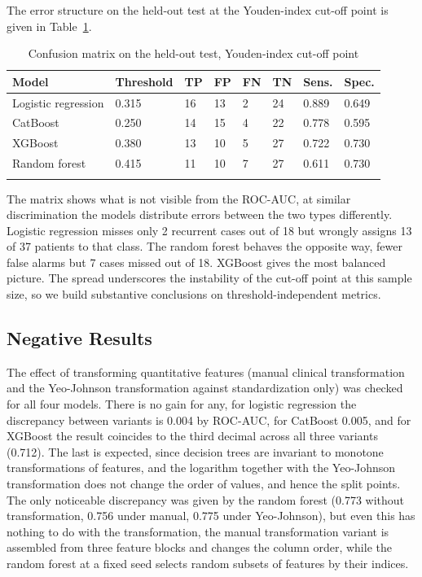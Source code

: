 \documentclass[pdflatex,sn-basic,Numbered]{sn-jnl}
\begin{document}
The error structure on the held-out test at the Youden-index cut-off point is given in Table~\ref{tab5}.

\begin{table}[h]
\caption{Confusion matrix on the held-out test, Youden-index cut-off point}\label{tab5}%
\begin{tabular}{@{}llllllll@{}}
\toprule
Model & Threshold & TP & FP & FN & TN & Sens. & Spec.\\
\midrule
Logistic regression & 0.315 & 16 & 13 & 2 & 24 & 0.889 & 0.649\\
CatBoost & 0.250 & 14 & 15 & 4 & 22 & 0.778 & 0.595\\
XGBoost & 0.380 & 13 & 10 & 5 & 27 & 0.722 & 0.730\\
Random forest & 0.415 & 11 & 10 & 7 & 27 & 0.611 & 0.730\\
\botrule
\end{tabular}
\end{table}

The matrix shows what is not visible from the ROC-AUC, at similar discrimination the models distribute errors between the two types differently. Logistic regression misses only 2 recurrent cases out of 18 but wrongly assigns 13 of 37 patients to that class. The random forest behaves the opposite way, fewer false alarms but 7 cases missed out of 18. XGBoost gives the most balanced picture. The spread underscores the instability of the cut-off point at this sample size, so we build substantive conclusions on threshold-independent metrics.

\subsection{Negative Results}\label{subsec3_6}

The effect of transforming quantitative features (manual clinical transformation and the Yeo-Johnson transformation against standardization only) was checked for all four models. There is no gain for any, for logistic regression the discrepancy between variants is 0.004 by ROC-AUC, for CatBoost 0.005, and for XGBoost the result coincides to the third decimal across all three variants (0.712). The last is expected, since decision trees are invariant to monotone transformations of features, and the logarithm together with the Yeo-Johnson transformation does not change the order of values, and hence the split points. The only noticeable discrepancy was given by the random forest (0.773 without transformation, 0.756 under manual, 0.775 under Yeo-Johnson), but even this has nothing to do with the transformation, the manual transformation variant is assembled from three feature blocks and changes the column order, while the random forest at a fixed seed selects random subsets of features by their indices.
\end{document}
